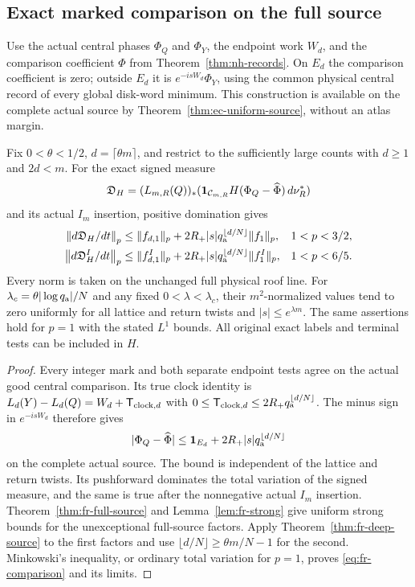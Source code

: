 \subsection{Exact marked comparison on the full source}
Use the actual central phases $\Phi_Q$ and $\Phi_Y$, the endpoint
work $W_d$, and the comparison coefficient $\widehat\Phi$ from
Theorem~\ref{thm:nh-records}.  On $E_d$ the comparison coefficient
is zero; outside $E_d$ it is $e^{-isW_d}\Phi_Y$, using the common
physical central record of every global disk-word minimum.
This construction is available on the complete actual source by
Theorem~\ref{thm:ec-uniform-source}, without an atlas margin.

\begin{corollary}
\label{cor:fr-full-comparison}
Fix $0<\theta<1/2$, $d=\lceil\theta m\rceil$, and restrict to
the sufficiently large counts with $d\ge1$ and $2d<m$.
For the exact signed measure
\[
 \mathfrak D_H=(L_{m,R}(Q))_*
       (\mathbf1_{\mathcal C_{m,R}}H(\Phi_Q-\widehat\Phi)\,d\nu_R^*)
\]
and its actual $I_m$ insertion, positive domination gives
\begin{align}\label{eq:fr-comparison}
 \left\|d\mathfrak D_H/dt\right\|_p
   &\le\|f_{d,1}\|_p
       +2R_+|s|q_{\rm a}^{\lfloor d/N\rfloor}\|f_1\|_p,
                      &&1<p<3/2,\notag\\
 \left\|d\mathfrak D_H^I/dt\right\|_p
   &\le\|f^I_{d,1}\|_p
       +2R_+|s|q_{\rm a}^{\lfloor d/N\rfloor}\|f^I_1\|_p,
                      &&1<p<6/5.
\end{align}
Every norm is taken on the unchanged full physical roof line.
For $\lambda_c=\theta|\log q_{\rm a}|/N$ and any fixed
$0<\lambda<\lambda_c$, their $m^2$-normalized values tend to zero
uniformly for all lattice and return twists and $|s|\le e^{\lambda m}$.
The same assertions hold for $p=1$ with the stated $L^1$ bounds.
All original exact labels and terminal tests can be included in $H$.
\end{corollary}
\begin{proof}
Every integer mark and both separate endpoint tests agree on the
actual good central comparison.  Its true clock identity is
$L_d(Y)-L_d(Q)=W_d+\mathsf T_{{\rm clock},d}$ with
$0\le\mathsf T_{{\rm clock},d}
       \le2R_+q_{\rm a}^{\lfloor d/N\rfloor}$.
The minus sign in $e^{-isW_d}$ therefore gives
\[
 |\Phi_Q-\widehat\Phi|
  \le\mathbf1_{E_d}+2R_+|s|q_{\rm a}^{\lfloor d/N\rfloor}
\]
on the complete actual source.  The bound is independent of the
lattice and return twists.  Its pushforward dominates the total
variation of the signed measure, and the same is true after the
nonnegative actual $I_m$ insertion.  Theorem~\ref{thm:fr-full-source}
and Lemma~\ref{lem:fr-strong} give uniform strong bounds for the
unexceptional full-source factors.  Apply
Theorem~\ref{thm:fr-deep-source} to the first factors and use
$\lfloor d/N\rfloor\ge\theta m/N-1$ for the second.
Minkowski's inequality, or ordinary total variation for $p=1$,
proves \eqref{eq:fr-comparison} and its limits.
\end{proof}

